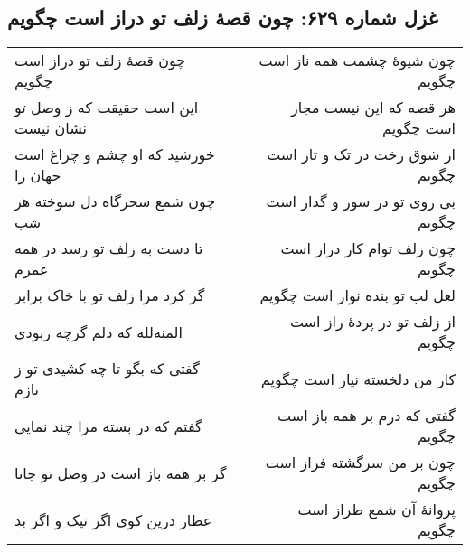 \begin{center}
\section*{غزل شماره ۶۲۹: چون قصهٔ زلف تو دراز است چگویم}
\label{sec:629}
\begin{longtable}{l p{0.5cm} r}
چون قصهٔ زلف تو دراز است چگویم
&&
چون شیوهٔ چشمت همه ناز است چگویم
\\
این است حقیقت که ز وصل تو نشان نیست
&&
هر قصه که این نیست مجاز است چگویم
\\
خورشید که او چشم و چراغ است جهان را
&&
از شوق رخت در تک و تاز است چگویم
\\
چون شمع سحرگاه دل سوخته هر شب
&&
بی روی تو در سوز و گداز است چگویم
\\
تا دست به زلف تو رسد در همه عمرم
&&
چون زلف توام کار دراز است چگویم
\\
گر کرد مرا زلف تو با خاک برابر
&&
لعل لب تو بنده نواز است چگویم
\\
المنه‌لله که دلم گرچه ربودی
&&
از زلف تو در پردهٔ راز است چگویم
\\
گفتی که بگو تا چه کشیدی تو ز نازم
&&
کار من دلخسته نیاز است چگویم
\\
گفتم که در بسته مرا چند نمایی
&&
گفتی که درم بر همه باز است چگویم
\\
گر بر همه باز است در وصل تو جانا
&&
چون بر من سرگشته فراز است چگویم
\\
عطار درین کوی اگر نیک و اگر بد
&&
پروانهٔ آن شمع طراز است چگویم
\\
\end{longtable}
\end{center}
